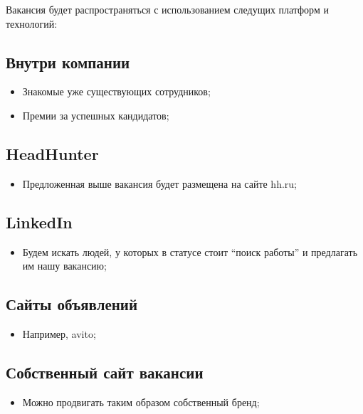 \documentclass[a4paper,8pt]{article}
\begin{document}
Вакансия будет распространяться с использованием следущих платформ и технологий:

\subsection*{Внутри компании}
    \begin{itemize}
        \item Знакомые уже существующих сотрудников;
        \item Премии за успешных кандидатов;
    \end{itemize}

\subsection*{HeadHunter}

    \begin{itemize}
        \item Предложенная выше вакансия будет размещена на сайте hh.ru;
    \end{itemize}

\subsection*{LinkedIn}

    \begin{itemize}
        \item Будем искать людей, у которых в статусе стоит ``поиск работы'' и предлагать им нашу вакансию;
    \end{itemize}

\subsection*{Сайты объявлений}

    \begin{itemize}
        \item Например, avito;
    \end{itemize}

\subsection*{Собственный сайт вакансии}

    \begin{itemize}
        \item Можно продвигать таким образом собственный бренд;
    \end{itemize}
\end{document}
